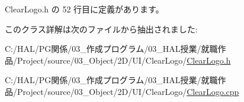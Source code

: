  Clear\+Logo.\+h の 52 行目に定義があります。



このクラス詳解は次のファイルから抽出されました\+:\begin{DoxyCompactItemize}
\item 
C\+:/\+H\+A\+L/\+P\+G関係/03\+\_\+作成プログラム/03\+\_\+\+H\+A\+L授業/就職作品/\+Project/source/03\+\_\+\+Object/2\+D/\+U\+I/\+Clear\+Logo/\mbox{\hyperlink{_clear_logo_8h}{Clear\+Logo.\+h}}\item 
C\+:/\+H\+A\+L/\+P\+G関係/03\+\_\+作成プログラム/03\+\_\+\+H\+A\+L授業/就職作品/\+Project/source/03\+\_\+\+Object/2\+D/\+U\+I/\+Clear\+Logo/\mbox{\hyperlink{_clear_logo_8cpp}{Clear\+Logo.\+cpp}}\end{DoxyCompactItemize}

